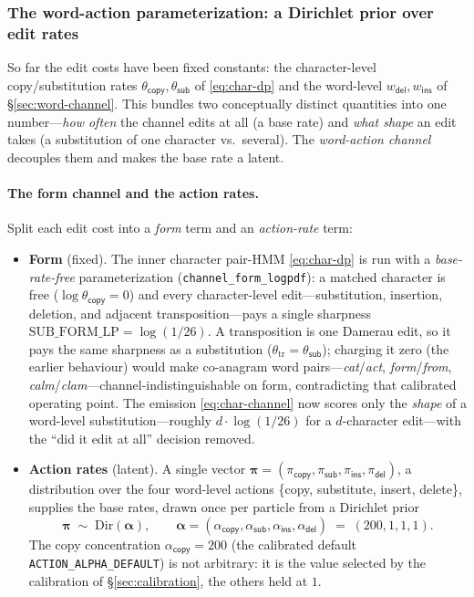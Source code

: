 \documentclass[11pt]{article}
\providecommand{\copyact}{\textsf{copy}}
\providecommand{\subact}{\textsf{sub}}
\providecommand{\insact}{\textsf{ins}}
\providecommand{\delact}{\textsf{del}}
\providecommand{\code}[1]{\texttt{#1}}
\providecommand{\wdel}{w_{\delact}}
\providecommand{\wins}{w_{\insact}}
\providecommand{\actdist}{\bm{\pi}}            %
\providecommand{\pcopy}{\pi_{\copyact}}
\providecommand{\psub}{\pi_{\subact}}
\providecommand{\pins}{\pi_{\insact}}
\providecommand{\pdel}{\pi_{\delact}}
\providecommand{\Dir}{\mathrm{Dir}}
\begin{document}
\subsubsection{The word-action parameterization: a Dirichlet prior over edit rates}
\label{sec:word-action}

So far the edit costs have been fixed constants: the character-level copy/substitution rates $\theta_{\copyact},\theta_{\subact}$ of \eqref{eq:char-dp} and the word-level $\wdel,\wins$ of \S\ref{sec:word-channel}. This bundles two conceptually distinct quantities into one number---\emph{how often} the channel edits at all (a base rate) and \emph{what shape} an edit takes (a substitution of one character vs.\ several). The \emph{word-action channel} decouples them and makes the base rate a latent.

\paragraph{The form channel and the action rates.} Split each edit cost into a \emph{form} term and an \emph{action-rate} term:
\begin{itemize}[leftmargin=1.6em,itemsep=1pt]
\item \textbf{Form} (fixed). The inner character pair-HMM \eqref{eq:char-dp} is run with a \emph{base-rate-free} parameterization (\code{channel\_form\_logpdf}): a matched character is free ($\log\theta_{\copyact}=0$) and every character-level edit---substitution, insertion, deletion, and adjacent transposition---pays a single sharpness $\mathrm{SUB\_FORM\_LP} = \log(1/26)$. A transposition is one Damerau edit, so it pays the same sharpness as a substitution ($\theta_{\mathrm{tr}}=\theta_{\subact}$); charging it zero (the earlier behaviour) would make co-anagram word pairs---\emph{cat}/\emph{act}, \emph{form}/\emph{from}, \emph{calm}/\emph{clam}---channel-indistinguishable on form, contradicting that calibrated operating point. The emission \eqref{eq:char-channel} now scores only the \emph{shape} of a word-level substitution---roughly $d\cdot\log(1/26)$ for a $d$-character edit---with the ``did it edit at all'' decision removed.
\item \textbf{Action rates} (latent). A single vector $\actdist = (\pcopy,\psub,\pins,\pdel)$, a distribution over the four word-level actions \{copy, substitute, insert, delete\}, supplies the base rates, drawn once per particle from a Dirichlet prior
        \begin{equation}\label{eq:action-prior}
          \actdist \;\sim\; \Dir(\bm\alpha), \qquad
          \bm\alpha = (\alpha_{\copyact},\alpha_{\subact},\alpha_{\insact},\alpha_{\delact})
                    \;=\; (200,1,1,1).
        \end{equation}
The copy concentration $\alpha_{\copyact}=200$ (the calibrated default \code{ACTION\_ALPHA\_DEFAULT}) is not arbitrary: it is the value selected by the calibration of \S\ref{sec:calibration}, the others held at $1$.
\end{itemize}
\end{document}
